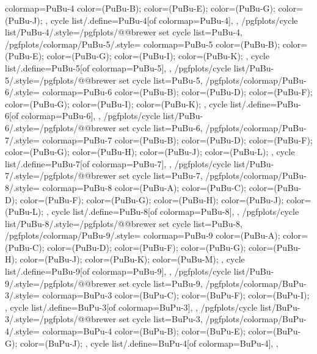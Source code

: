 {{    colormap={PuBu-4}{
      color=(PuBu-B);
      color=(PuBu-E);
      color=(PuBu-G);
      color=(PuBu-J);
    },
    cycle list/.define={PuBu-4}{[of colormap=PuBu-4]},
  },
  /pgfplots/cycle list/PuBu-4/.style={/pgfplots/@@brewer set cycle list={PuBu-4}},
  /pgfplots/colormap/PuBu-5/.style={
    colormap={PuBu-5}{
      color=(PuBu-B);
      color=(PuBu-E);
      color=(PuBu-G);
      color=(PuBu-I);
      color=(PuBu-K);
    },
    cycle list/.define={PuBu-5}{[of colormap=PuBu-5]},
  },
  /pgfplots/cycle list/PuBu-5/.style={/pgfplots/@@brewer set cycle list={PuBu-5}},
  /pgfplots/colormap/PuBu-6/.style={
    colormap={PuBu-6}{
      color=(PuBu-B);
      color=(PuBu-D);
      color=(PuBu-F);
      color=(PuBu-G);
      color=(PuBu-I);
      color=(PuBu-K);
    },
    cycle list/.define={PuBu-6}{[of colormap=PuBu-6]},
  },
  /pgfplots/cycle list/PuBu-6/.style={/pgfplots/@@brewer set cycle list={PuBu-6}},
  /pgfplots/colormap/PuBu-7/.style={
    colormap={PuBu-7}{
      color=(PuBu-B);
      color=(PuBu-D);
      color=(PuBu-F);
      color=(PuBu-G);
      color=(PuBu-H);
      color=(PuBu-J);
      color=(PuBu-L);
    },
    cycle list/.define={PuBu-7}{[of colormap=PuBu-7]},
  },
  /pgfplots/cycle list/PuBu-7/.style={/pgfplots/@@brewer set cycle list={PuBu-7}},
  /pgfplots/colormap/PuBu-8/.style={
    colormap={PuBu-8}{
      color=(PuBu-A);
      color=(PuBu-C);
      color=(PuBu-D);
      color=(PuBu-F);
      color=(PuBu-G);
      color=(PuBu-H);
      color=(PuBu-J);
      color=(PuBu-L);
    },
    cycle list/.define={PuBu-8}{[of colormap=PuBu-8]},
  },
  /pgfplots/cycle list/PuBu-8/.style={/pgfplots/@@brewer set cycle list={PuBu-8}},
  /pgfplots/colormap/PuBu-9/.style={
    colormap={PuBu-9}{
      color=(PuBu-A);
      color=(PuBu-C);
      color=(PuBu-D);
      color=(PuBu-F);
      color=(PuBu-G);
      color=(PuBu-H);
      color=(PuBu-J);
      color=(PuBu-K);
      color=(PuBu-M);
    },
    cycle list/.define={PuBu-9}{[of colormap=PuBu-9]},
  },
  /pgfplots/cycle list/PuBu-9/.style={/pgfplots/@@brewer set cycle list={PuBu-9}},
  /pgfplots/colormap/BuPu-3/.style={
    colormap={BuPu-3}{
      color=(BuPu-C);
      color=(BuPu-F);
      color=(BuPu-I);
    },
    cycle list/.define={BuPu-3}{[of colormap=BuPu-3]},
  },
  /pgfplots/cycle list/BuPu-3/.style={/pgfplots/@@brewer set cycle list={BuPu-3}},
  /pgfplots/colormap/BuPu-4/.style={
    colormap={BuPu-4}{
      color=(BuPu-B);
      color=(BuPu-E);
      color=(BuPu-G);
      color=(BuPu-J);
    },
    cycle list/.define={BuPu-4}{[of colormap=BuPu-4]},
  },
}
